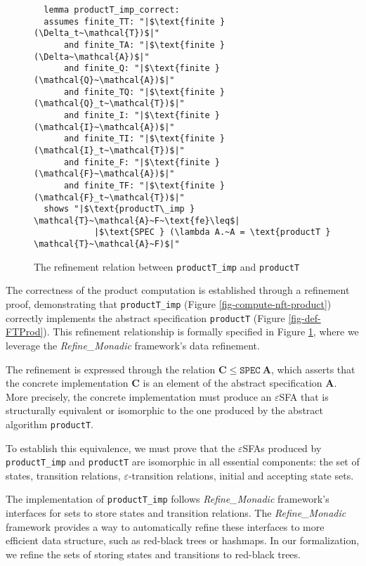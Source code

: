 \documentclass[sigplan,10pt,anonymous,review]{acmart}\settopmatter{printfolios=true,printccs=false,printacmref=false}
\begin{document}
  \begin{figure}[hbt!]
    \begin{lstlisting}
  lemma productT_imp_correct:
  assumes finite_TT: "|$\text{finite } (\Delta_t~\mathcal{T})$|"
      and finite_TA: "|$\text{finite } (\Delta~\mathcal{A})$|"
      and finite_Q: "|$\text{finite } (\mathcal{Q}~\mathcal{A})$|"
      and finite_TQ: "|$\text{finite } (\mathcal{Q}_t~\mathcal{T})$|"
      and finite_I: "|$\text{finite } (\mathcal{I}~\mathcal{A})$|"
      and finite_TI: "|$\text{finite } (\mathcal{I}_t~\mathcal{T})$|"
      and finite_F: "|$\text{finite } (\mathcal{F}~\mathcal{A})$|"
      and finite_TF: "|$\text{finite } (\mathcal{F}_t~\mathcal{T})$|"
  shows "|$\text{productT\_imp } \mathcal{T}~\mathcal{A}~F~\text{fe}\leq$|
            |$\text{SPEC } (\lambda A.~A = \text{productT } \mathcal{T}~\mathcal{A}~F)$|"
  \end{lstlisting}
  \caption{The refinement relation between \texttt{productT\_imp} and \texttt{productT}}
  \label{fig-def-productT_imp_correct}
  \end{figure}

  The correctness of the product computation is established through a refinement proof, demonstrating that \texttt{productT\_imp} (Figure \ref{fig-compute-nft-product}) correctly implements the abstract specification \texttt{productT} (Figure \ref{fig-def-FTProd}). This refinement relationship is formally specified in Figure \ref{fig-def-productT_imp_correct}, where we leverage the \emph{Refine\_Monadic} framework's data refinement.

  The refinement is expressed through the relation $\mathbf{C} \leq \texttt{SPEC}~\mathbf{A}$, which asserts that the concrete implementation $\mathbf{C}$ is an element of the abstract specification $\mathbf{A}$. More precisely,  the concrete implementation must produce an $\varepsilon$SFA that is structurally equivalent or isomorphic to the one produced by the abstract algorithm \texttt{productT}.

  To establish this equivalence, we must prove that the $\varepsilon$SFAs produced by \texttt{productT\_imp} and \texttt{productT} are isomorphic in all essential components: the set of states, transition relations, $\varepsilon$-transition relations, initial and accepting state sets.



The implementation of \texttt{productT\_imp} follows \emph{Refine\_Monadic} framework's interfaces for sets to store states and transition relations. 
The \emph{Refine\_Monadic} framework provides a way to automatically refine these interfaces to more efficient data structure, such as red-black trees or hashmaps. 
In our formalization, we refine the sets of storing states and transitions to red-black trees.
\end{document}
